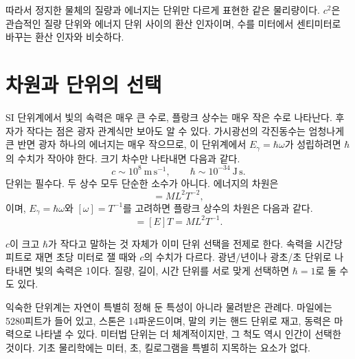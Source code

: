 따라서 정지한 물체의 질량과 에너지는 단위만 다르게 표현한 같은 물리량이다. \(c^2\)은 관습적인 질량 단위와 에너지 단위 사이의 환산 인자이며, 수를 미터에서 센티미터로 바꾸는 환산 인자와 비슷하다.

\begin{classroomqa}\end{classroomqa}

\section{차원과 단위의 선택}

SI 단위계에서 빛의 속력은 매우 큰 수로, 플랑크 상수는 매우 작은 수로 나타난다. 후자가 작다는 점은 광자 관계식만 보아도 알 수 있다. 가시광선의 각진동수는 엄청나게 큰 반면 광자 하나의 에너지는 매우 작으므로, 이 단위계에서 \(E_\gamma=\hbar\omega\)가 성립하려면 \(\hbar\)의 수치가 작아야 한다. 크기 차수만 나타내면 다음과 같다.
\begin{equation}
c\sim 10^8\ \mathrm{m\,s^{-1}},
\qquad
\hbar\sim 10^{-34}\ \mathrm{J\,s}.
\end{equation}
단위는 필수다. 두 상수 모두 단순한 소수가 아니다. 에너지의 차원은
\begin{equation}
[E]=M L^2 T^{-2},
\end{equation}
이며, \(E_\gamma=\hbar\omega\)와 \([\omega]=T^{-1}\)를 고려하면 플랑크 상수의 차원은 다음과 같다.
\begin{equation}
[\hbar]=[E]T=M L^2 T^{-1}.
\end{equation}

\(c\)이 크고 \(\hbar\)가 작다고 말하는 것 자체가 이미 단위 선택을 전제로 한다. 속력을 시간당 피트로 재면 초당 미터로 잴 때와 \(c\)의 수치가 다르다. 광년/년이나 광초/초 단위로 나타내면 빛의 속력은 1이다. 질량, 길이, 시간 단위를 서로 맞게 선택하면 \(\hbar=1\)로 둘 수도 있다.

익숙한 단위계는 자연이 특별히 정해 둔 특성이 아니라 물려받은 관례다. 마일에는 5280피트가 들어 있고, 스톤은 14파운드이며, 말의 키는 핸드 단위로 재고, 동력은 마력으로 나타낼 수 있다. 미터법 단위는 더 체계적이지만, 그 척도 역시 인간이 선택한 것이다. 기초 물리학에는 미터, 초, 킬로그램을 특별히 지목하는 요소가 없다.


